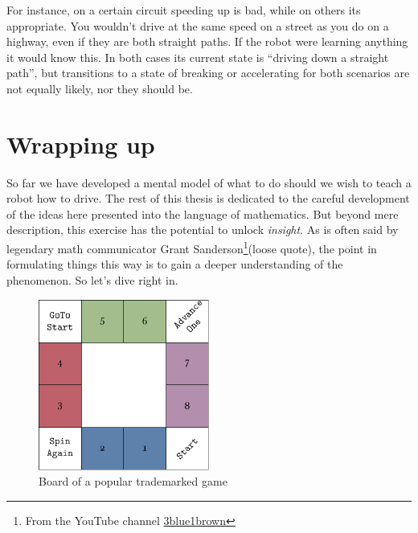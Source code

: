 For instance, on a certain circuit speeding up is bad, while on 
others its appropriate. You wouldn't drive at the same speed on 
a street as you do on a highway, even if they are both straight 
paths.  If the robot were learning anything it would know this. 
In both cases its current state is ``driving down a straight 
path'', but transitions to a state of breaking or accelerating 
for both scenarios are not equally likely, nor they should be.

\section{Wrapping up}
So far we have developed a mental model of what to do should we 
wish to teach a robot how to drive. The rest of this thesis is 
dedicated to the careful development of the ideas here presented 
into the language of mathematics. But beyond mere description, 
this exercise has the potential to unlock \textit{insight}. As 
is often said by legendary math communicator Grant 
Sanderson\footnote{From the YouTube channel 
\href{https://www.youtube.com/channel/UCYO_jab_esuFRV4b17AJtAw}{3blue1brown}}(loose 
quote), the point in formulating things this way is to gain a 
deeper understanding of the phenomenon. So let's dive right in.

\begin{figure}
\centering
\includegraphics[width=0.5\textwidth]{img/board.pdf}
\caption{Board of a popular trademarked game}
\end{figure}
